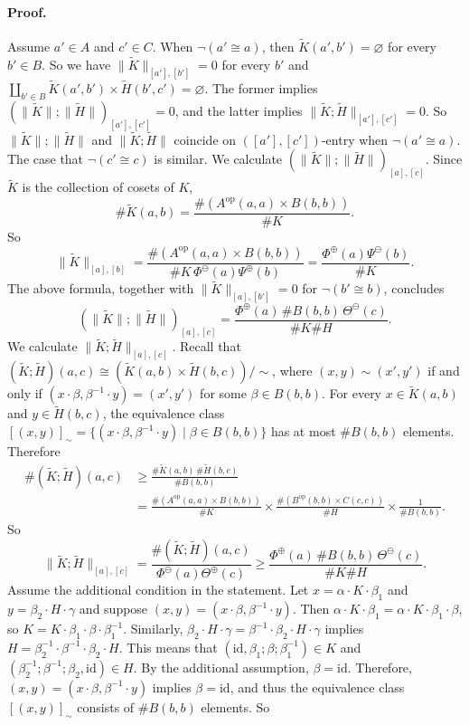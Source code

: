 \documentclass[10pt,a4paper]{article}
\newcommand{\norm}[1]{\lVert#1\rVert}
\begin{document}
\paragraph{Proof.} Assume $a'\in A$ and $c'\in C$. When $\neg(a'\cong a)$, then $\widetilde K(a',b')=\varnothing$ for every $b'\in B$. So we have $\norm{\widetilde K}_{[a'],[b']}=0$ for every $b'$ and $\coprod_{b'\in B}\widetilde K(a',b')\times\widetilde H(b',c')=\varnothing$. The former implies $(\norm{\widetilde K};\norm{\widetilde H})_{[a'],[c']}=0$, and the latter implies $\norm{\widetilde K;\widetilde H}_{[a'],[c']}=0$. So $\norm{\widetilde K};\norm{\widetilde H}$ and $\norm{\widetilde K;\widetilde H}$ coincide on $([a'],[c'])$-entry when $\neg(a'\cong a)$. The case that $\neg(c'\cong c)$ is similar.
We calculate $(\norm{\widetilde K};\norm{\widetilde H})_{[a],[c]}$. Since $\widetilde K$ is the collection of cosets of $K$,
\[
\#\widetilde K(a,b)=\frac{\#(A^{\mathrm{op}}(a,a)\times B(b,b))}{\#K}.
\]
So
\[
\norm{\widetilde K}_{[a],[b]}=
\frac{\#(A^{\mathrm{op}}(a,a)\times B(b,b))}{\#K\,\Phi^\ominus(a)\Psi^\oplus(b)}
=\frac{\Phi^\oplus(a)\Psi^\ominus(b)}{\#K}.
\]
The above formula, together with $\norm{\widetilde K}_{[a],[b']}=0$ for $\neg(b'\cong b)$, concludes
\[
(\norm{\widetilde K};\norm{\widetilde H})_{[a],[c]}
=\frac{\Phi^\oplus(a)\,\#B(b,b)\,\Theta^\ominus(c)}{\#K\#H}.
\]
We calculate $\norm{\widetilde K;\widetilde H}_{[a],[c]}$. Recall that $(\widetilde K;\widetilde H)(a,c)\cong(\widetilde K(a,b)\times\widetilde H(b,c))/{\sim}$, where $(x,y)\sim(x',y')$ if and only if $(x\cdot\beta,\beta^{-1}\cdot y)=(x',y')$ for some $\beta\in B(b,b)$. For every $x\in\widetilde K(a,b)$ and $y\in\widetilde H(b,c)$, the equivalence class $[(x,y)]_\sim=\{(x\cdot\beta,\beta^{-1}\cdot y)\mid\beta\in B(b,b)\}$ has at most $\#B(b,b)$ elements. Therefore
\[
\begin{aligned}
\#(\widetilde K;\widetilde H)(a,c)&\ge\frac{\#\widetilde K(a,b)\,\#\widetilde H(b,c)}{\#B(b,b)}\\
&=\frac{\#(A^{\mathrm{op}}(a,a)\times B(b,b))}{\#K}
 \times\frac{\#(B^{\mathrm{op}}(b,b)\times C(c,c))}{\#H}
 \times\frac1{\#B(b,b)}.
\end{aligned}
\]
So
\[
\norm{\widetilde K;\widetilde H}_{[a],[c]}
=\frac{\#(\widetilde K;\widetilde H)(a,c)}{\Phi^\ominus(a)\Theta^\oplus(c)}
\ge\frac{\Phi^\oplus(a)\,\#B(b,b)\,\Theta^\ominus(c)}{\#K\#H}.
\]
Assume the additional condition in the statement. Let $x=\alpha\cdot K\cdot\beta_1$ and $y=\beta_2\cdot H\cdot\gamma$ and suppose $(x,y)=(x\cdot\beta,\beta^{-1}\cdot y)$. Then $\alpha\cdot K\cdot\beta_1=\alpha\cdot K\cdot\beta_1\cdot\beta$, so $K=K\cdot\beta_1\cdot\beta\cdot\beta_1^{-1}$. Similarly, $\beta_2\cdot H\cdot\gamma=\beta^{-1}\cdot\beta_2\cdot H\cdot\gamma$ implies $H=\beta_2^{-1}\cdot\beta^{-1}\cdot\beta_2\cdot H$. This means that $(\mathrm{id},\beta_1;\beta;\beta_1^{-1})\in K$ and $(\beta_2^{-1};\beta^{-1};\beta_2,\mathrm{id})\in H$. By the additional assumption, $\beta=\mathrm{id}$. Therefore, $(x,y)=(x\cdot\beta,\beta^{-1}\cdot y)$ implies $\beta=\mathrm{id}$, and thus the equivalence class $[(x,y)]_\sim$ consists of $\#B(b,b)$ elements. So
\end{document}
